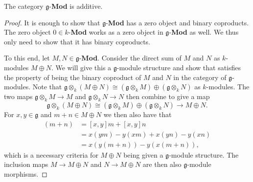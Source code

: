 \begin{lemma}
  The category $ \mathfrak{g} $-\textbf{Mod} is additive.
\end{lemma}
\begin{proof}
  It is enough to show that $ \mathfrak{g} $-\textbf{Mod} has a zero object and binary coproducts. The zero object $ 0 \in k $-\textbf{Mod} works as a zero object in $ \mathfrak{g} $-\textbf{Mod} as well. We thus only need to show that it has binary coproducts.

  To this end, let $ M,N \in \mathfrak{g} $-\textbf{Mod}. Consider the direct sum of $ M $ and $ N $ as $ k $-modules $ M \oplus N $. We will give this a $ \mathfrak{g} $-module structure and show that satisfies the property of being the binary coproduct of $ M $ and $ N $ in the category of $ \mathfrak{g} $-modules. Note that $ \mathfrak{g} \otimes_k (M \oplus N) \cong (\mathfrak{g} \otimes_k M) \oplus (\mathfrak{g} \otimes_k N) $ as $ k $-modules. The two maps $ \mathfrak{g} \otimes_k M \to M $ and $ \mathfrak{g} \otimes_k N \to N $ then combine to give a map
  \begin{equation}
    \mathfrak{g} \otimes_k (M \oplus N) \cong (\mathfrak{g} \otimes_k M) \oplus (\mathfrak{g} \otimes_k N)  \to M \oplus N.
    \label{eq:bincop}
  \end{equation}
  For $ x,y \in \mathfrak{g} $ and $ m + n \in M \oplus N $ we then also have that
  \begin{align*}
    [x,y](m + n) &= [x,y]m + [x,y]n \\
                 &= x(ym) - y(xm) + x(yn) - y(xn) \\
                 &= x(y(m + n)) - y(x(m + n)),
  \end{align*}
  which is a necessary criteria for $ M \oplus N $ being given a $ \mathfrak{g} $-module structure. The inclusion maps $ M \to M \oplus N $ and $ N \to M \oplus N $ are then also $ \mathfrak{g} $-module morphisms.


\end{proof}
